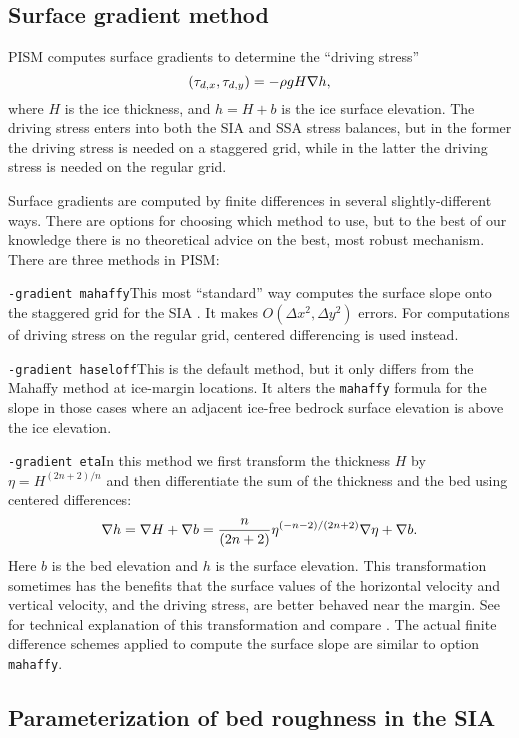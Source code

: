 \subsection{Surface gradient method}
\label{subsect:gradient}

PISM computes surface gradients to determine the ``driving stress''
	$$(\tau_{d,x},\tau_{d,y}) = - \rho g H \nabla h,$$
where $H$ is the ice thickness, and $h = H+b$ is the ice surface elevation.  The driving stress enters into both the SIA and SSA stress balances, but in the former the driving stress is needed on a staggered grid, while in the latter the driving stress is needed on the regular grid.

Surface gradients are computed by finite differences in several slightly-different ways.  There are options for choosing which method to use, but to the best of our knowledge there is no theoretical advice on the best, most robust mechanism.  There are three  methods in PISM:

\noindent\texttt{-gradient mahaffy}\quad  This most ``standard'' way computes the surface slope onto the staggered grid for the SIA \cite{Mahaffy}.  It makes $O(\Delta x^2,\Delta y^2)$ errors.  For computations of driving stress on the regular grid, centered differencing is used instead.

\noindent\texttt{-gradient haseloff}\quad  This is the default method, but it only differs from the Mahaffy method at ice-margin locations.  It alters the \texttt{mahaffy} formula for the slope in those cases where an adjacent ice-free bedrock surface elevation is above the ice elevation.

\noindent\texttt{-gradient eta}\quad  In this method we first transform the thickness $H$ by $\eta = H^{(2n+2)/n}$ and then differentiate the sum of the thickness and the bed using centered differences:
	$$\nabla h = \nabla H + \nabla b = \frac{n}{(2n+2)} \eta^{(-n-2)/(2n+2)} \nabla \eta + \nabla b.$$
Here $b$ is the bed elevation and $h$ is the surface elevation.  This transformation sometimes has the benefits that the surface values of the horizontal velocity and vertical velocity, and the driving stress, are better behaved near the margin.  See \cite{BLKCB,CDDSV} for technical explanation of this transformation and compare \cite{SaitoMargin}.  The actual finite difference schemes applied to compute the surface slope are similar to option \texttt{mahaffy}.


\subsection{Parameterization of bed roughness in the SIA} \label{subsect:bedsmooth} 

